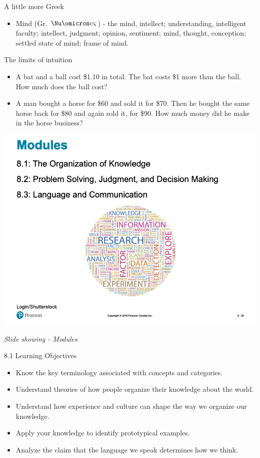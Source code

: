 \documentclass[
]{book}
\providecommand{\tightlist}{%
  \setlength{\itemsep}{0pt}\setlength{\parskip}{0pt}}
\begin{document}
A little more Greek

\begin{itemize}
\tightlist
\item
  Mind (Gr. \(\Nu\omicron\upsilon\varsigma\)) - the mind, intellect; understanding, intelligent faculty; intellect, judgment; opinion, sentiment; mind, thought, conception; settled state of mind; frame of mind.
\end{itemize}

The limits of intuition

\begin{itemize}
\tightlist
\item
  A bat and a ball cost \$1.10 in total. The bat costs \$1 more than the ball. How much does the ball cost?\\
\item
  A man bought a horse for \$60 and sold it for \$70. Then he bought the same horse back for \$80 and again sold it, for \$90. How much money did he make in the horse business?
\end{itemize}

\includegraphics{assets/unit_1/slide_39.png}

\emph{Slide showing - Modules}

8.1 Learning Objectives

\begin{itemize}
\tightlist
\item
  Know the key terminology associated with concepts and categories.\\
\item
  Understand theories of how people organize their knowledge about the world.\\
\item
  Understand how experience and culture can shape the way we organize our knowledge.\\
\item
  Apply your knowledge to identify prototypical examples.\\
\item
  Analyze the claim that the language we speak determines how we think.
\end{itemize}
\end{document}
